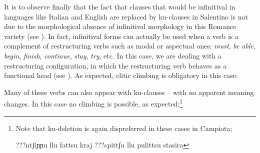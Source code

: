 \documentclass[output=paper]{langscibook}
\begin{document}
\ea \label{ac19}
    \z
\z
    
It is to observe finally that the fact that clauses that would be infinitival in languages like Italian and English are replaced by ku-clauses in Salentino is not due to the morphological absence of infinitival morphology in this Romance variety (see \citealt{calabrese1993a}). In fact, infinitival forms can actually be used when a verb is a complement of restructuring verbs such as modal or aspectual ones: \textit{must}, \textit{be able}, \textit{begin}, \textit{finish}, \textit{continue}, \textit{stay}, \textit{try}, etc. In this case, we are dealing with a restructuring configuration, in which the restructuring verb behaves as a functional head (see \citealt{rizzi1976a, rizzi1978a, cinque2001a, cinque2006a, wurmbrand2001a,wurmbrand2004a,wurmbrand2015,wurmbrand2017verb}).  As expected, clitic climbing is obligatory in this case:

\ea \label{ac20}
    \z
\z

Many of these verbs can also appear with ku-clauses -- with no apparent meaning changes. In this case no climbing is possible, as expected:\footnote{Note that ku-deletion is again dispreferred in these cases in Campiota;

\ea \label{fn10ex}
    \ea \label{fn10exa}???ntʃiɲɲu llu fattsu kraj  
    \ex \label{fn10exb}???spittʃu llu pulittsu stasira
    \z
\z
} 
\end{document}
